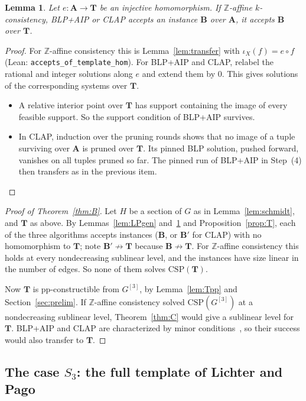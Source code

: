 \documentclass[11pt]{article}
\newtheorem{lemma}[theorem]{Lemma}
\theoremstyle{definition}
\theoremstyle{remark}
\newcommand{\Csp}{\mathrm{CSP}}
\newcommand{\Z}{\mathbb Z}
\begin{document}
\begin{lemma}\label{lem:templatehom}
Let $e\colon\mathbf A\to\mathbf T$ be an injective homomorphism. If $\Z$-affine
$k$-consistency, BLP+AIP or CLAP accepts an instance $\mathbf B$ over $\mathbf A$,
it accepts $\mathbf B$ over $\mathbf T$.
\end{lemma}
\begin{proof}
For $\Z$-affine consistency this is Lemma~\ref{lem:transfer} with
$\iota_X(f)=e\circ f$ (Lean: \texttt{accepts\_of\_template\_hom}). For BLP+AIP and
CLAP, relabel the rational and integer solutions along $e$ and extend them by $0$.
This gives solutions of the corresponding systems over $\mathbf T$.
\begin{itemize}
\item A relative interior point over $\mathbf T$ has support containing the image
of every feasible support. So the support condition of BLP+AIP survives.
\item In CLAP, induction over the pruning rounds shows that no image of a tuple
surviving over $\mathbf A$ is pruned over $\mathbf T$. Its pinned BLP solution,
pushed forward, vanishes on all tuples pruned so far. The pinned run of
BLP+AIP in Step~(4) then transfers as in the previous item.
\end{itemize}
\end{proof}

\begin{proof}[Proof of Theorem~\ref{thm:B}]
Let $H$ be a section of $G$ as in Lemma~\ref{lem:schmidt}, and $\mathbf T$ as
above. By Lemmas~\ref{lem:LPgen} and~\ref{lem:templatehom} and
Proposition~\ref{prop:T}, each of the three algorithms accepts instances ($\mathbf
B$, or $\mathbf B'$ for CLAP) with no homomorphism to $\mathbf T$; note
$\mathbf B'\not\to\mathbf T$ because $\mathbf B\not\to\mathbf T$. For $\Z$-affine consistency this holds at every nondecreasing
sublinear level, and the instances have size linear in the number of edges. So
none of them solves $\Csp(\mathbf T)$.

Now $\mathbf T$ is pp-constructible from $G^{[3]}$, by Lemma~\ref{lem:Tpp} and
Section~\ref{sec:prelim}. If $\Z$-affine consistency solved $\Csp(G^{[3]})$ at a
nondecreasing sublinear level, Theorem~\ref{thm:C} would give a sublinear level
for $\mathbf T$. BLP+AIP and CLAP are characterized by minor
conditions~\cite{BGWZ20,CZ23}, so their success would also transfer to
$\mathbf T$.
\end{proof}

\subsection{The case \texorpdfstring{$S_3$}{S3}: the full template of Lichter and Pago}
\end{document}
